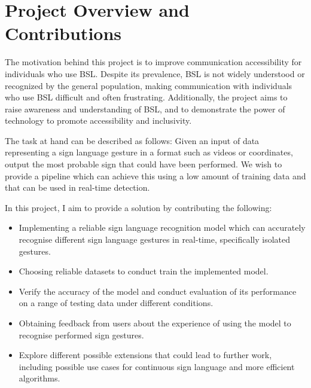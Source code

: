 \documentclass[final,dissertation.tex]{subfiles}
\begin{document}
\section{Project Overview and Contributions}

The motivation behind this project is to improve communication accessibility for individuals who use BSL. Despite its prevalence, BSL is not widely understood or recognized by the general population, making communication with individuals who use BSL difficult and often frustrating. Additionally, the project aims to raise awareness and understanding of BSL, and to demonstrate the power of technology to promote accessibility and inclusivity.

The task at hand can be described as follows: Given an input of data representing a sign language gesture in a format such as videos or coordinates, output the most probable sign that could have been performed. We wish to provide a pipeline which can achieve this using a low amount of training data and that can be used in real-time detection.

In this project, I aim to provide a solution by contributing the following:
\begin{itemize}
    \item Implementing a reliable sign language recognition model which can accurately recognise different sign language gestures in real-time, specifically isolated gestures.
    \item Choosing reliable datasets to conduct train the implemented model.
    \item Verify the accuracy of the model and conduct evaluation of its performance on a range of testing data under different conditions.
    \item Obtaining feedback from users about the experience of using the model to recognise performed sign gestures.
    \item Explore different possible extensions that could lead to further work, including possible use cases for continuous sign language and more efficient algorithms.
\end{itemize}
\end{document}
